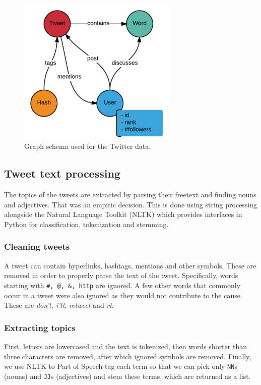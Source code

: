 \begin{figure}[t]
\centering
\includegraphics[width=3.0in,natwidth=440,natheight=409]{images/Schema.png}
\caption{Graph schema used for the Twitter data.}
\label{fig:schema}
\end{figure}

\subsection{Tweet text processing}

The topics of the tweets are extracted by parsing their freetext and
finding nouns and adjectives. That was an empiric decision. This is done 
using string processing alongside the Natural Language Toolkit (NLTK) 
\cite{bird2006nltk} which provides interfaces in Python for classification, 
tokenization and stemming.

\subsubsection{Cleaning tweets}

A tweet can contain hyperlinks, hashtags, mentions and other symbols. These are
removed in order to properly parse the text of the tweet. Specifically, words
starting with \verb|#, @, &, http| are ignored. A few other words that
commonly occur in a tweet were also ignored as they would not contribute to the
cause. These are \textit{don't, i'll, retweet} and \textit{rt}.

\subsubsection{Extracting topics}

First, letters are lowercased and the text is tokenized, then words shorter than
three characters are removed, after which ignored symbols are removed. Finally,
we use NLTK to Part of Speech-tag \cite{pos} each term so that we can pick only
\texttt{NN}s (nouns) and \texttt{JJ}s (adjectives) and stem these terms, which are
returned as a list.

